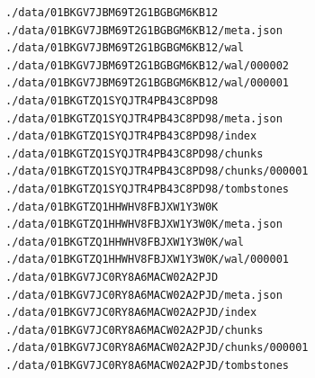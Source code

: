 \documentclass[titlepage]{report}
\begin{document}
\begin{minipage}{\linewidth}
\begin{lstlisting}[caption={Beispiel für die Datenspeicherung in Prometheus},label={lst:prometheusstorage}]
./data/01BKGV7JBM69T2G1BGBGM6KB12
./data/01BKGV7JBM69T2G1BGBGM6KB12/meta.json
./data/01BKGV7JBM69T2G1BGBGM6KB12/wal
./data/01BKGV7JBM69T2G1BGBGM6KB12/wal/000002
./data/01BKGV7JBM69T2G1BGBGM6KB12/wal/000001
./data/01BKGTZQ1SYQJTR4PB43C8PD98
./data/01BKGTZQ1SYQJTR4PB43C8PD98/meta.json
./data/01BKGTZQ1SYQJTR4PB43C8PD98/index
./data/01BKGTZQ1SYQJTR4PB43C8PD98/chunks
./data/01BKGTZQ1SYQJTR4PB43C8PD98/chunks/000001
./data/01BKGTZQ1SYQJTR4PB43C8PD98/tombstones
./data/01BKGTZQ1HHWHV8FBJXW1Y3W0K
./data/01BKGTZQ1HHWHV8FBJXW1Y3W0K/meta.json
./data/01BKGTZQ1HHWHV8FBJXW1Y3W0K/wal
./data/01BKGTZQ1HHWHV8FBJXW1Y3W0K/wal/000001
./data/01BKGV7JC0RY8A6MACW02A2PJD
./data/01BKGV7JC0RY8A6MACW02A2PJD/meta.json
./data/01BKGV7JC0RY8A6MACW02A2PJD/index
./data/01BKGV7JC0RY8A6MACW02A2PJD/chunks
./data/01BKGV7JC0RY8A6MACW02A2PJD/chunks/000001
./data/01BKGV7JC0RY8A6MACW02A2PJD/tombstones
\end{lstlisting}
\end{minipage}
\end{document}
